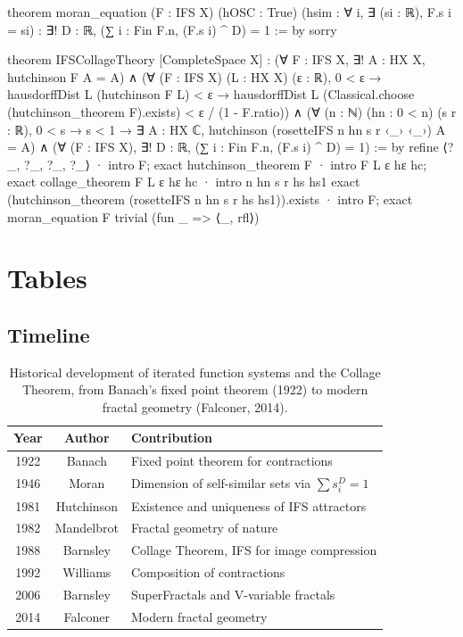 \documentclass[10pt]{amsart}
\theoremstyle{break}
\begin{document}
\begin{leanlisting}
theorem moran_equation
    (F : IFS X) (hOSC : True)
    (hsim : ∀ i, ∃ (si : ℝ), F.s i = si) :
    ∃! D : ℝ, (∑ i : Fin F.n, (F.s i) ^ D) = 1 := by
  sorry

theorem IFSCollageTheory [CompleteSpace X] :
    (∀ F : IFS X, ∃! A : HX X, hutchinson F A = A) ∧
    (∀ (F : IFS X) (L : HX X) (ε : ℝ), 0 < ε →
      hausdorffDist L (hutchinson F L) < ε →
      hausdorffDist L (Classical.choose (hutchinson_theorem F).exists) < ε / (1 - F.ratio)) ∧
    (∀ (n : ℕ) (hn : 0 < n) (s r : ℝ), 0 < s → s < 1 →
      ∃ A : HX ℂ, hutchinson (rosetteIFS n hn s r ‹_› ‹_›) A = A) ∧
    (∀ (F : IFS X), ∃! D : ℝ, (∑ i : Fin F.n, (F.s i) ^ D) = 1) := by
  refine ⟨?_, ?_, ?_, ?_⟩
  · intro F; exact hutchinson_theorem F
  · intro F L ε hε hc; exact collage_theorem F L ε hε hc
  · intro n hn s r hs hs1
    exact (hutchinson_theorem (rosetteIFS n hn s r hs hs1)).exists
  · intro F; exact moran_equation F trivial (fun _ => ⟨_, rfl⟩)
\end{leanlisting}

\section{Tables}

\setcounter{table}{0}
\subsection{Timeline}

\begin{table}[H]
	\centering
	{\fontsize{8}{10}\selectfont
		\begin{tabular}{|c|c|p{8cm}|}
			\hline
			\textbf{Year} & \textbf{Author} & \textbf{Contribution} \\
			\hline
			1922 & Banach        & Fixed point theorem for contractions \\
			1946 & Moran         & Dimension of self-similar sets via $\sum s_i^D = 1$ \\
			1981 & Hutchinson    & Existence and uniqueness of IFS attractors \\
			1982 & Mandelbrot    & Fractal geometry of nature \\
			1988 & Barnsley      & Collage Theorem, IFS for image compression \\
			1992 & Williams      & Composition of contractions \\
			2006 & Barnsley      & SuperFractals and V-variable fractals \\
			2014 & Falconer      & Modern fractal geometry \\
			\hline
	\end{tabular}}
	\caption{%
		Historical development of iterated function systems and the
		Collage Theorem, from Banach's fixed point theorem (1922) to
		modern fractal geometry (Falconer, 2014).%
	}
	\label{tab:timeline}
\end{table}
\end{document}
